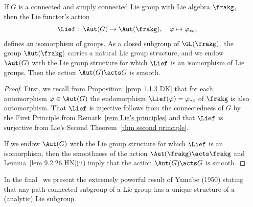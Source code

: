 \begin{cor}[{\cite[Cor.~9.5.11]{HN}}]\label{cor 9.5.11 HN}
    If $G$ is a connected and simply connected Lie group with Lie algebra $\frakg$, then the Lie functor's action
    \[\Lief:\; \Aut(G)\to \Aut(\frakg), \quad \varphi\mapsto \varphi_{\ast e},\]
    defines an isomorphism of groups. As a closed subgroup of $\GL(\frakg)$, the group $\Aut(\frakg)$ carries a natural Lie group structure, and we endow $\Aut(G)$ with the Lie group structure for which $\Lief$ is an isomorphism of Lie groups. Then the action $\Aut(G)\acts G$ is smooth.
\end{cor}
\begin{proof}
    First, we recall from Proposition~\ref{prop 1.1.3 DK} that for each automorphism $\varphi\in\Aut(G)$ the endomorphism $\Lief(\varphi)=\varphi_{\ast e}$ of $\frakg$ is also automorphism. That $\Lief$ is injective follows from the connectedness of $G$ by the First Principle from Remark~\ref{rem Lie's principles} and that $\Lief$ is surjective from Lie's Second Theorem~\ref{thm second principle}.

    If we endow $\Aut(G)$ with the Lie group structure for which $\Lief$ is an isomorphism, then the smoothness of the action $\Aut(\frakg)\acts \frakg$ and Lemma~\ref{lem 9.2.26 HN}(ii) imply that the action $\Aut(G)\acts G$ is smooth.
\end{proof}


In the final \sect\ we present the extremely powerful result of Yamabe (1950) stating that any path-connected subgroup of a Lie group has a unique structure of a (analytic) Lie subgroup.






